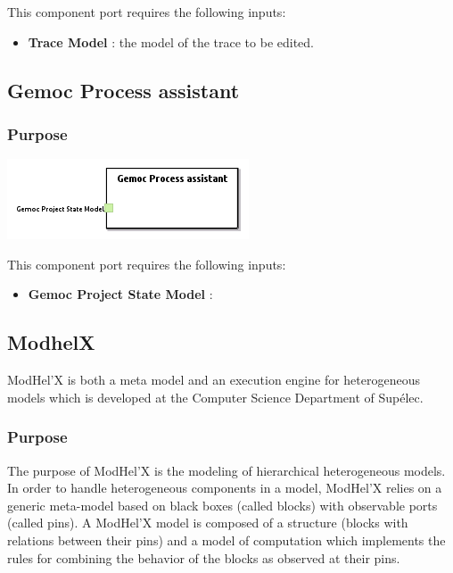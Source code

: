 \documentclass{gemoc} %
\begin{document}
This component port requires the following inputs:
\begin{itemize}
  \item \textbf{Trace Model} :
the model of the trace to be edited.
\end{itemize}


\subsection{Gemoc Process assistant}


\subsubsection{Purpose}

\begin{center}
\includegraphics*[trim=0.0cm 0.0cm 0cm 0.0cm, clip=true]{../images/generated/Generated_Gemoc_Process_assistant.png}
\end{center}

This component port requires the following inputs:
\begin{itemize}
  \item \textbf{Gemoc Project State Model} :
\end{itemize}


\subsection{ModhelX}
ModHel'X is both a meta model and an execution engine for heterogeneous models which is developed at the Computer Science Department of Supélec.

\subsubsection{Purpose}
The purpose of ModHel'X is the modeling of hierarchical heterogeneous models. In order to handle heterogeneous components in a model, ModHel'X relies on a generic meta-model based on black boxes (called blocks) with observable ports (called pins). A ModHel'X model is composed of a structure (blocks with relations between their pins) and a model of computation which implements the rules for combining the behavior of the blocks as observed at their pins.
\end{document}
